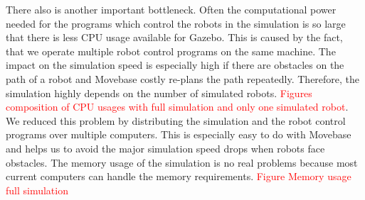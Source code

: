 There also is another important bottleneck. Often the computational power needed for the programs which control the robots in the simulation is so large that there is less CPU usage available for Gazebo. This is caused by the fact, that we operate multiple robot control programs on the same machine. The impact on the simulation speed is especially high if there are obstacles on the path of a robot and Movebase costly re-plans the path repeatedly. Therefore, the simulation highly depends on the number of simulated robots. \textcolor{red}{Figures composition of CPU usages with full simulation and only one simulated robot}. We reduced this problem by distributing the simulation and the robot control programs over multiple computers. This is especially easy to do with Movebase and helps us to avoid the major simulation speed drops when robots face obstacles.
The memory usage of the simulation is no real problems because most current computers can handle the memory requirements. \textcolor{red}{Figure Memory usage full simulation}

